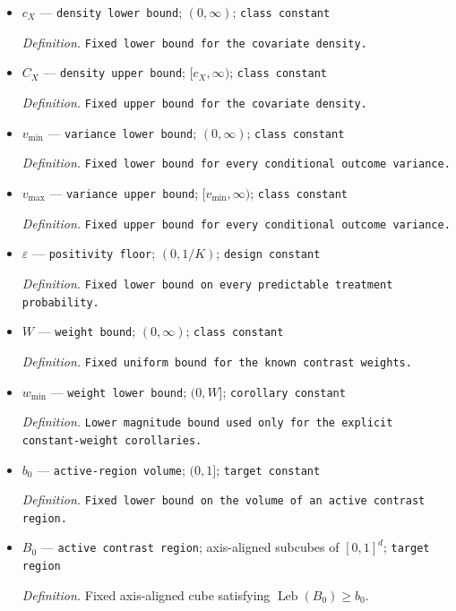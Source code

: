 \documentclass{article}
\begin{document}
\begin{itemize}
  \par\smallskip\noindent\emph{Definition.} \texttt{Fixed uniform bound for the conditional outcome means.}
  \item \(c_X\) --- \texttt{density lower bound}; \((0,\infty)\); \texttt{class constant}
  \par\smallskip\noindent\emph{Definition.} \texttt{Fixed lower bound for the covariate density.}
  \item \(C_X\) --- \texttt{density upper bound}; \([c_X,\infty)\); \texttt{class constant}
  \par\smallskip\noindent\emph{Definition.} \texttt{Fixed upper bound for the covariate density.}
  \item \(v_{\min}\) --- \texttt{variance lower bound}; \((0,\infty)\); \texttt{class constant}
  \par\smallskip\noindent\emph{Definition.} \texttt{Fixed lower bound for every conditional outcome variance.}
  \item \(v_{\max}\) --- \texttt{variance upper bound}; \([v_{\min},\infty)\); \texttt{class constant}
  \par\smallskip\noindent\emph{Definition.} \texttt{Fixed upper bound for every conditional outcome variance.}
  \item \(\varepsilon\) --- \texttt{positivity floor}; \((0,1/K)\); \texttt{design constant}
  \par\smallskip\noindent\emph{Definition.} \texttt{Fixed lower bound on every predictable treatment probability.}
  \item \(W\) --- \texttt{weight bound}; \((0,\infty)\); \texttt{class constant}
  \par\smallskip\noindent\emph{Definition.} \texttt{Fixed uniform bound for the known contrast weights.}
  \item \(w_{\min}\) --- \texttt{weight lower bound}; \((0,W]\); \texttt{corollary constant}
  \par\smallskip\noindent\emph{Definition.} \texttt{Lower magnitude bound used only for the explicit constant-\allowbreak{}weight corollaries.}
  \item \(b_0\) --- \texttt{active-\allowbreak{}region volume}; \((0,1]\); \texttt{target constant}
  \par\smallskip\noindent\emph{Definition.} \texttt{Fixed lower bound on the volume of an active contrast region.}
  \item \(B_0\) --- \texttt{active contrast region}; axis-aligned subcubes of \([0,1]^d\); \texttt{target region}
  \par\smallskip\noindent\emph{Definition.} Fixed axis-aligned cube satisfying \(\operatorname{Leb}(B_0)\ge b_0\).

\end{itemize}
\end{document}
